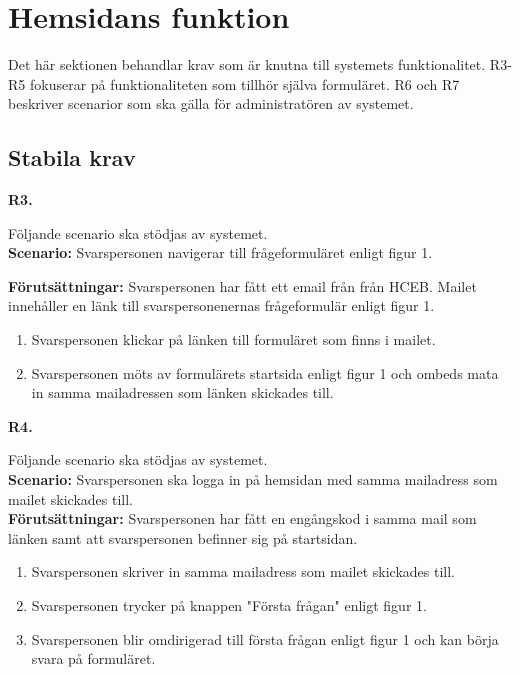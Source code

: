 \documentclass{article}
\begin{document}
    \section{Hemsidans funktion}
\normalsize{Det här sektionen behandlar krav som är knutna till systemets funktionalitet. R3-R5 fokuserar på funktionaliteten som tillhör själva formuläret. R6 och R7 beskriver scenarior som ska gälla för administratören av systemet.
}
    \subsection{Stabila krav}
    
    \large{\textbf{R3.}}
    \normalsize{Följande scenario ska stödjas av systemet. \\
    \textbf{Scenario:} Svarspersonen navigerar till frågeformuläret enligt figur 1.
        
    \noindent \textbf{Förutsättningar:} Svarspersonen har fått ett email från från HCEB. Mailet innehåller en länk till svarspersonenernas frågeformulär enligt figur 1.
        \begin{enumerate}
            \item Svarspersonen klickar på länken till formuläret som finns i mailet.
            \item Svarspersonen möts av formulärets startsida enligt figur 1 och ombeds mata in samma mailadressen som länken skickades till. 
        \end{enumerate}
}
\vspace{1em}

\noindent \large{\textbf{R4.}}
    \normalsize{Följande scenario ska stödjas av systemet. \\
    \textbf{Scenario:} Svarspersonen ska logga in på hemsidan med samma mailadress som mailet skickades till.
        \\
    \textbf{Förutsättningar:} Svarspersonen har fått en engångskod i samma mail som länken samt att svarspersonen befinner sig på startsidan.
        \begin{enumerate}
           \item Svarspersonen skriver in samma mailadress som mailet skickades till.
           \item Svarspersonen trycker på knappen "Första frågan" enligt figur 1.
           \item  Svarspersonen blir omdirigerad till första frågan enligt figur 1 och kan börja svara på formuläret.
        \end{enumerate}
   }
   
\end{document}
